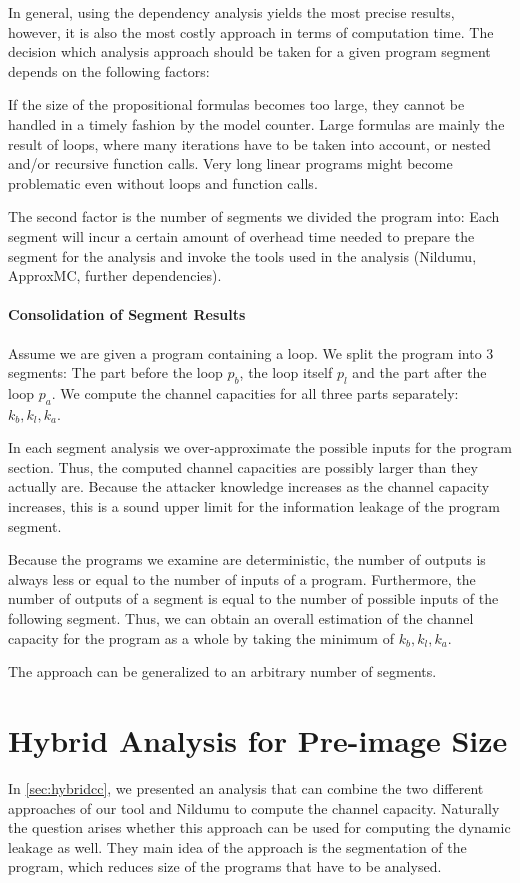 In general, using the dependency analysis yields the most precise results, however, it is also the most costly approach in terms of computation time. The decision which analysis approach should be taken for a given program segment depends on the following factors:

If the size of the propositional formulas becomes too large, they cannot be handled in a timely fashion by the model counter. Large formulas are mainly the result of loops, where many iterations have to be taken into account, or nested and/or recursive function calls. Very long linear programs might become problematic even without loops and function calls.

The second factor is the number of segments we divided the program into: Each segment will incur a certain amount of overhead time needed to prepare the segment for the analysis and invoke the tools used in the analysis (Nildumu, ApproxMC, further dependencies).


\paragraph{Consolidation of Segment Results}
Assume we are given a program containing a loop. We split the program into 3 segments: The part before the loop $p_b$, the loop itself $p_l$ and the part after the loop $p_a$.
We compute the channel capacities for all three parts separately: $k_b, k_l, k_a$.

In each segment analysis we over-approximate the possible inputs for the program section. Thus, the computed channel capacities are possibly larger than they actually are. Because the attacker knowledge increases as the channel capacity increases, this is a sound upper limit for the information leakage of the program segment.

Because the programs we examine are deterministic, the number of outputs is always less or equal to the number of inputs of a program. Furthermore, the number of outputs of a segment is equal to the number of possible inputs of the following segment. Thus, we can obtain an overall estimation of the channel capacity for the program as a whole by taking the minimum of $k_b, k_l, k_a$.

The approach can be generalized to an arbitrary number of segments.

\section{Hybrid Analysis for Pre-image Size}
In \ref{sec:hybridcc}, we presented an analysis that can combine the two different approaches of our tool and Nildumu to compute the channel capacity. Naturally the question arises whether this approach can be used for computing the dynamic leakage as well. They main idea of the approach is the segmentation of the program, which reduces size of the programs that have to be analysed.

